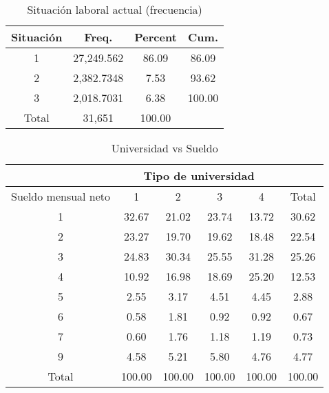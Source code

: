 \documentclass{article}
\begin{document}
\begin{table}[]
\centering
\caption{Situación laboral actual (frecuencia)}
\begin{tabular}{c|ccc} \hline \hline
Situación      & Freq.  & Percent & Cum. \\ \hline 
1 & 27,249.562 & 86.09  & 86.09         \\
2 & 2,382.7348 & 7.53   & 93.62         \\
3 & 2,018.7031 & 6.38   & 100.00        \\
Total         & 31,651 & 100.00      \\ \hline \hline
\end{tabular}
\end{table}

\begin{table}[]
\centering
\caption{Universidad vs Sueldo}
\begin{tabular}{c|cccc|c} \hline \hline
                               & \multicolumn{4}{c|}{Tipo de universidad}                        &  \\ \hline
Sueldo mensual neto & 1       & 2       & 3       & 4                    & Total                \\ \hline
1                              & 32.67   & 21.02   & 23.74   & 13.72                & 30.62                \\
2                              & 23.27   & 19.70   & 19.62   & 18.48                & 22.54                \\
3                              & 24.83   & 30.34   & 25.55   & 31.28                & 25.26                \\
4                              & 10.92   & 16.98   & 18.69   & 25.20                & 12.53                \\
5                              & 2.55    & 3.17    & 4.51    & 4.45                 & 2.88                 \\
6                              & 0.58    & 1.81    & 0.92    & 0.92                 & 0.67                 \\
7                              & 0.60    & 1.76    & 1.18    & 1.19                 & 0.73                 \\
9                              & 4.58    & 5.21    & 5.80    & 4.76                 & 4.77                 \\
Total                          & 100.00  & 100.00  & 100.00  & 100.00               & 100.00              \\ \hline \hline
\end{tabular}
\end{table}
\end{document}
